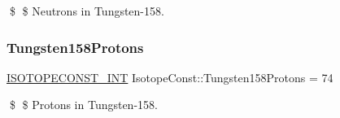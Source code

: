 \$ \$ Neutrons in Tungsten-\/158. \mbox{\label{group___isotope_const-_tungsten-_w158_ga86169a59eae0ecfd55a4e54fbb70f09f}} 
\subsubsection{\texorpdfstring{Tungsten158\+Protons}{Tungsten158Protons}}
{\footnotesize\ttfamily \mbox{\hyperlink{group___isotope_const-_macros_ga5f18360b3e99483a35c32d789e62621c}{I\+S\+O\+T\+O\+P\+E\+C\+O\+N\+S\+T\+\_\+\+I\+NT}} Isotope\+Const\+::\+Tungsten158\+Protons = 74}

\$ \$ Protons in Tungsten-\/158. 